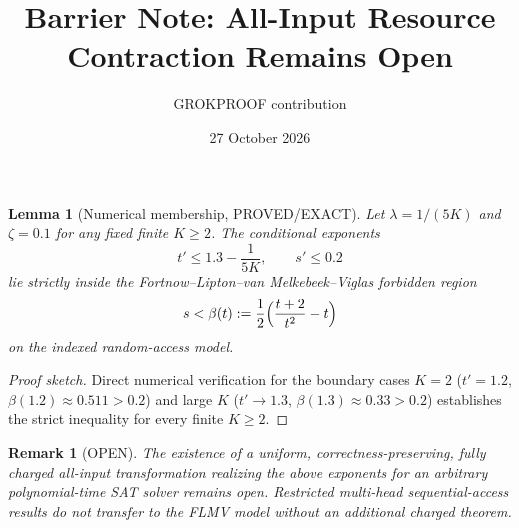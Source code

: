 \documentclass[11pt]{article}
\title{Barrier Note: All-Input Resource Contraction Remains Open}
\author{GROKPROOF contribution}
\date{27 October 2026}
\newtheorem{lemma}{Lemma}
\newtheorem{remark}{Remark}
\begin{document}
\maketitle

\begin{lemma}[Numerical membership, PROVED/EXACT]
\label{lem:numerical}
Let \(\lambda = 1/(5K)\) and \(\zeta = 0.1\) for any fixed finite \(K \ge 2\).  
The conditional exponents
\[
t' \le 1.3 - \frac1{5K},\qquad s' \le 0.2
\]
lie strictly inside the Fortnow–Lipton–van Melkebeek–Viglas forbidden region
\[
s < \beta(t) := \frac12\Bigl(\frac{t+2}{t^2}-t\Bigr)
\]
on the indexed random-access model.
\end{lemma}

\begin{proof}[Proof sketch]
Direct numerical verification for the boundary cases \(K=2\) (\(t'=1.2\), \(\beta(1.2)\approx 0.511 > 0.2\)) and large \(K\) (\(t'\to 1.3\), \(\beta(1.3)\approx 0.33 > 0.2\)) establishes the strict inequality for every finite \(K\ge 2\).
\end{proof}

\begin{remark}[OPEN]
The existence of a uniform, correctness-preserving, fully charged all-input transformation realizing the above exponents for an arbitrary polynomial-time SAT solver remains open. Restricted multi-head sequential-access results do not transfer to the FLMV model without an additional charged theorem.
\end{remark}
\end{document}
